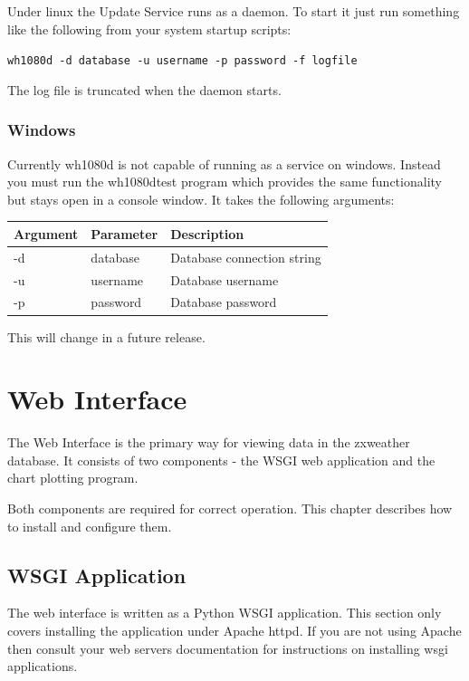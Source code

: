 \documentclass[a4paper,10pt,draft]{book}
\begin{document}
Under linux the Update Service runs as a daemon. To start it just run something like the following from your system startup scripts:

\verb|wh1080d -d database -u username -p password -f logfile|

The log file is truncated when the daemon starts.

\subsection{Windows}


Currently wh1080d is not capable of running as a service on windows. Instead you must run the wh1080dtest program which provides the same functionality but stays open in a console window. It takes the following arguments:

\begin{tabular}{l l p{10cm}}
\hline
\textbf{Argument} & \textbf{Parameter} & \textbf{Description} \\
\hline
-d & database & Database connection string \\
-u & username & Database username \\
-p & password & Database password \\
\hline
\end{tabular}

This will change in a future release.

\chapter{Web Interface}
\label{cha_web_interface}

The Web Interface is the primary way for viewing data in the zxweather database. It consists of two components - the WSGI web application and the chart plotting program.

Both components are required for correct operation. This chapter describes how to install and configure them.


\section{WSGI Application}

The web interface is written as a Python WSGI application. This section only covers installing the application under Apache httpd. If you are not using Apache then consult your web servers documentation for instructions on installing wsgi applications.
\end{document}
